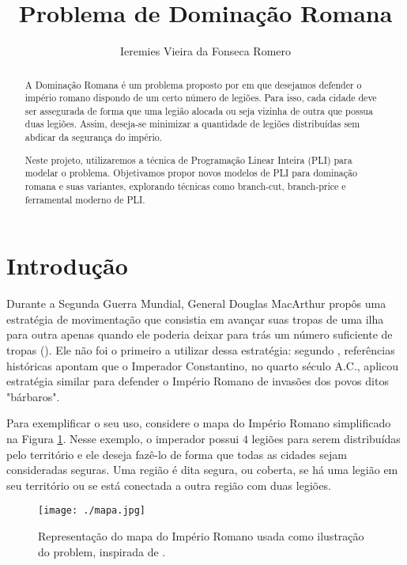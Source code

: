 \documentclass[11pt]{article}
\author{Ieremies Vieira da Fonseca Romero}
\date{}
\title{Problema de Dominação Romana}
\begin{document}
\maketitle
\begin{abstract}
A Dominação Romana é um problema proposto por \textcite{Stewart1999DefendRomanEmpire} em que desejamos defender o império romano dispondo de um certo número de legiões.
Para isso, cada cidade deve ser assegurada de forma que uma legião alocada ou seja vizinha de outra que possua duas legiões.
Assim, deseja-se minimizar a quantidade de legiões distribuídas sem abdicar da segurança do império.

Neste projeto, utilizaremos a técnica de Programação Linear Inteira (PLI) para modelar o problema.
Objetivamos propor novos modelos de PLI para dominação romana e suas variantes, explorando técnicas como branch-cut, branch-price e ferramental moderno de PLI.
\end{abstract}

\section{Introdução}
\label{sec:org4415860}
Durante a Segunda Guerra Mundial, General Douglas MacArthur propôs uma estratégia de movimentação que consistia em avançar suas tropas de uma ilha para outra apenas quando ele poderia deixar para trás um número suficiente de tropas (\autocite{Stewart1999DefendRomanEmpire}).
Ele não foi o primeiro a utilizar dessa estratégia: segundo \textcite{Stewart1999DefendRomanEmpire}, referências históricas apontam que o Imperador Constantino, no quarto século A.C., aplicou estratégia similar para defender o Império Romano de invasões dos povos ditos "bárbaros".

Para exemplificar o seu uso, considere o mapa do Império Romano simplificado na Figura \ref{fig:mapa}.
Nesse exemplo, o imperador possui \(4\) legiões para serem distribuídas pelo território e ele deseja fazê-lo de forma que todas as cidades sejam consideradas seguras.
Uma região é dita segura, ou coberta, se há uma legião em seu território ou se está conectada a outra região com duas legiões.

\begin{figure}[htbp]
\centering
\texttt{[image: ./mapa.jpg]}
\caption{\label{fig:mapa}Representação do mapa do Império Romano usada como ilustração do problem, inspirada de \textcite{Stewart1999DefendRomanEmpire}.}
\end{figure}
\end{document}
